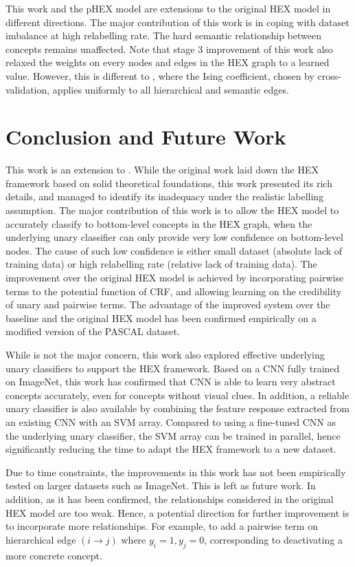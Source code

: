 \documentclass[11pt,a4paper]{book}
\begin{document}
This work and the pHEX model are extensions to the original HEX model in different directions. The major contribution of this work is in coping with dataset imbalance at high relabelling rate. The hard semantic relationship between concepts remains unaffected. Note that stage 3 improvement of this work also relaxed the weights on every nodes and edges in the HEX graph to a learned value. However, this is different to \cite{ding2015probabilistic}, where the Ising coefficient, chosen by cross-validation, applies uniformly to all hierarchical and semantic edges.

\chapter{Conclusion and Future Work}
\label{chap:conclusion}

This work is an extension to \cite{deng2014large}. While the original work laid down the HEX framework based on solid theoretical foundations, this work presented its rich details, and managed to identify its inadequacy under the realistic labelling assumption. The major contribution of this work is to allow the HEX model to accurately classify to bottom-level concepts in the HEX graph, when the underlying unary classifier can only provide very low confidence on bottom-level nodes. The cause of such low confidence is either small dataset (absolute lack of training data) or high relabelling rate (relative lack of training data). The improvement over the original HEX model is achieved by incorporating pairwise terms to the potential function of CRF, and allowing learning on the credibility of unary and pairwise terms. The advantage of the improved system over the baseline and the original HEX model has been confirmed empirically on a modified version of the PASCAL dataset.

While is not the major concern, this work also explored effective underlying unary classifiers to support the HEX framework. 
Based on a CNN \cite{krizhevsky2012imagenet} fully trained on ImageNet, this work has confirmed that CNN is able to learn very abstract concepts accurately, even for concepts without visual clues. In addition, a reliable unary classifier is also available by combining the feature response extracted from an existing CNN with an SVM array. Compared to using a fine-tuned CNN as the underlying unary classifier, the SVM array can be trained in parallel, hence significantly reducing the time to adapt the HEX framework to a new dataset.

Due to time constraints, the improvements in this work has not been empirically tested on larger datasets such as ImageNet. This is left as future work. In addition, as it has been confirmed, the relationships considered in the original HEX model are too weak. Hence, a potential direction for further improvement is to incorporate more relationships. For example, to add a pairwise term on hierarchical edge $(i\rightarrow j)$ where $y_i=1,y_j=0$, corresponding to deactivating a more concrete concept.
\end{document}
